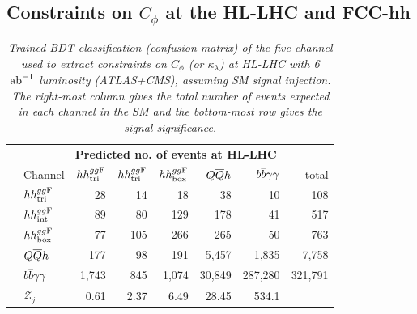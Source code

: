\subsection{Constraints on \texorpdfstring{$C_\phi$}{CH} at the HL-LHC and FCC-hh}
\label{sec:CH}

\begin{table}[]
	\centering
	{\footnotesize
		\begin{tabular}{ll|rrrrr|r}
			\multirow{7}{*}{\rb{\bf Actual no. of events\hspace{0.45cm}}} & \multicolumn{7}{c}{\bf Predicted no. of events at HL-LHC}\\
			\cmidrule[\heavyrulewidth]{2-8}
			& Channel & $hh^{gg\rm F}_{\rm tri}$ & $hh^{gg\rm F}_{\rm tri}$ &  $hh^{gg\rm F}_{\rm box}$&      $Q\overline Q h$ & $b\overline b\gamma\gamma$ &   total \\
			\cline{2-8}
			&$hh^{gg\rm F}_{\rm tri}$         &   28 &	14 &	18&	38&	10&	108 \\
			&$hh^{gg\rm F}_{\rm int}$         &   	89&	80&	129&	178&	41&	517\\
			&$hh^{gg\rm F}_{\rm box}$         &   77&	105&	266&	265&	50&	763 \\
			&$Q\overline Q h$           &  177&	98&	191&	5,457&	1,835& 7,758 \\
			&$b\overline b\gamma\gamma$          & 1,743&	845&	1,074& 30,849&	287,280&	321,791 \\
			\cline{2-8}
			&$\mathcal{Z}_j$& 0.61&	2.37&	6.49&	28.45&	534.1	&       \\
			\cmidrule[\heavyrulewidth]{2-8}
		\end{tabular}
	}
	\caption{\it Trained BDT classification (confusion matrix) of the five channel used to extract constraints on $C_\phi$ (or $\kappa_\lambda$) at HL-LHC with 6 $\text{ab}^{-1}$ luminosity (ATLAS+CMS), assuming SM signal injection. The right-most column gives the total number of events expected in each channel in the SM and the bottom-most row gives the signal significance.}
	\label{tab:HL-LHC-confusion-CH}
	\centering
	{\footnotesize
		
}
\end{table}
